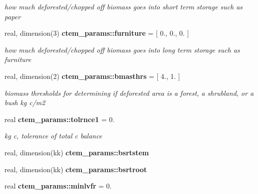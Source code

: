 \begin{DoxyCompactItemize}
\begin{DoxyCompactList}\small\item\em how much deforested/chopped off biomass goes into short term storage such as paper \end{DoxyCompactList}\item 
\hypertarget{namespacectem__params_afde8cda60ab64e6f3699c990584b5aaf}{}real, dimension(3) {\bfseries ctem\+\_\+params\+::furniture} = \mbox{[} 0., 0., 0. \mbox{]}\label{namespacectem__params_afde8cda60ab64e6f3699c990584b5aaf}

\begin{DoxyCompactList}\small\item\em how much deforested/chopped off biomass goes into long term storage such as furniture \end{DoxyCompactList}\item 
\hypertarget{namespacectem__params_a49b01c9f504b799a16e1aa9224c1011f}{}real, dimension(2) {\bfseries ctem\+\_\+params\+::bmasthrs} = \mbox{[} 4., 1. \mbox{]}\label{namespacectem__params_a49b01c9f504b799a16e1aa9224c1011f}

\begin{DoxyCompactList}\small\item\em biomass thresholds for determining if deforested area is a forest, a shrubland, or a bush kg c/m2 \end{DoxyCompactList}\item 
\hypertarget{namespacectem__params_a1ecb947f804fa8a4db85cb4524c12957}{}real {\bfseries ctem\+\_\+params\+::tolrnce1} = 0.\label{namespacectem__params_a1ecb947f804fa8a4db85cb4524c12957}

\begin{DoxyCompactList}\small\item\em kg c, tolerance of total c balance \end{DoxyCompactList}\item 
\hypertarget{namespacectem__params_a3e315466e92bff767c21df28defa0a96}{}real, dimension(kk) {\bfseries ctem\+\_\+params\+::bsrtstem}\label{namespacectem__params_a3e315466e92bff767c21df28defa0a96}

\item 
\hypertarget{namespacectem__params_a38e12fbd4194b73db2a5d635ffb9701b}{}real, dimension(kk) {\bfseries ctem\+\_\+params\+::bsrtroot}\label{namespacectem__params_a38e12fbd4194b73db2a5d635ffb9701b}

\item 
\hypertarget{namespacectem__params_afd2af8cee888fd84bf7e89a6a2b5c981}{}real {\bfseries ctem\+\_\+params\+::minlvfr} = 0.\label{namespacectem__params_afd2af8cee888fd84bf7e89a6a2b5c981}


\end{DoxyCompactItemize}
